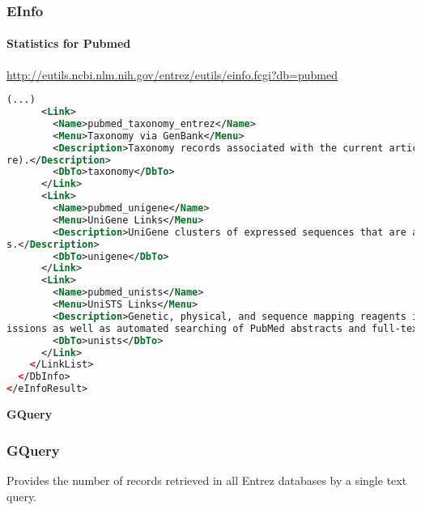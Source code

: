\documentclass{beamer}
\newcommand{\centeredtitle}[1]{
\begin{center}
    \Huge{\bf{#1}}
\end{center}
}
\newcommand{\hugeslide}[1]{
\begin{frame}
\centeredtitle{#1}
\end{frame}
}
\begin{document}
\begin{frame}[fragile]
\frametitle{EInfo}
\framesubtitle{Statistics for Pubmed}
\url{http://eutils.ncbi.nlm.nih.gov/entrez/eutils/einfo.fcgi?db=pubmed}
\begin{lstlisting}[language=xml,basicstyle=\tiny,breaklines=false]
(...)
      <Link>
        <Name>pubmed_taxonomy_entrez</Name>
        <Menu>Taxonomy via GenBank</Menu>
        <Description>Taxonomy records associated with the current articles through taxonomic information on related molecular database records (Nucleotide, Protein, Gene, SNP, Structu
re).</Description>
        <DbTo>taxonomy</DbTo>
      </Link>
      <Link>
        <Name>pubmed_unigene</Name>
        <Menu>UniGene Links</Menu>
        <Description>UniGene clusters of expressed sequences that are associated with the current articles through references on the clustered sequence records and related Gene record
s.</Description>
        <DbTo>unigene</DbTo>
      </Link>
      <Link>
        <Name>pubmed_unists</Name>
        <Menu>UniSTS Links</Menu>
        <Description>Genetic, physical, and sequence mapping reagents in the UniSTS database associated with the current articles through references on sequence tagged site (STS) subm
issions as well as automated searching of PubMed abstracts and full-text PubMed Central articles for marker names.</Description>
        <DbTo>unists</DbTo>
      </Link>
    </LinkList>
  </DbInfo>
</eInfoResult>
\end{lstlisting}
\end{frame}



\hugeslide{GQuery}


\begin{frame}[fragile]
\frametitle{GQuery}
Provides the number of records retrieved in all Entrez databases by a single text query.
\end{frame}
\end{document}
